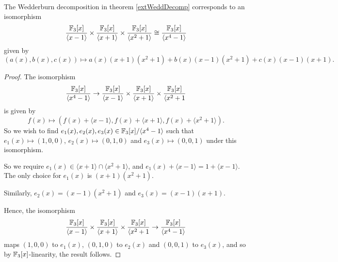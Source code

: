 \documentclass{unswmaths}
\begin{document}
\begin{lemma}
\label{intWeddDecomp}
    The Wedderburn decomposition in theorem \ref{extWeddDecomp} corresponds to
    an isomorphism
    \begin{equation*}
        \frac{{\mathbb{F}_3}[x]}{\langle x-1\rangle}\times\frac{{\mathbb{F}_3}[x]}{\langle x+1\rangle}\times\frac{{\mathbb{F}_3}[x]}{\langle x^2+1\rangle}\cong \frac{{\mathbb{F}_3}[x]}{\langle x^4-1\rangle}
    \end{equation*}
    given by
    \begin{equation*}
        (a(x),b(x),c(x))\mapsto a(x)(x+1)(x^2+1)+b(x)(x-1)(x^2+1)+c(x)(x-1)(x+1).
    \end{equation*}
\end{lemma}
\begin{proof}
    The isomorphism
    \begin{equation*}
        \frac{{\mathbb{F}_3}[x]}{\langle x^4-1\rangle} \rightarrow \frac{{\mathbb{F}_3}[x]}{\langle x-1\rangle}\times\frac{{\mathbb{F}_3}[x]}{\langle x+1\rangle}\times\frac{{\mathbb{F}_3}[x]}{\langle x^2+1}
    \end{equation*}
    is given by
    \begin{equation*}
        f(x) \mapsto (f(x)+\langle x-1\rangle,f(x)+\langle x+1\rangle,f(x)+\langle x^2+1\rangle).
    \end{equation*}
    So we wish to find $e_1(x),e_2(x),e_3(x) \in {\mathbb{F}_3}[x]/\langle x^4-1\rangle$ such that $e_1(x)\mapsto (1,0,0)$,
    $e_2(x)\mapsto (0,1,0)$ and $e_3(x)\mapsto (0,0,1)$ under this isomorphism.
    
    So we require $e_1(x) \in \langle x+1\rangle\cap\langle x^2+1\rangle$, and 
    $e_1(x) + \langle x-1\rangle = 1+\langle x-1\rangle$. The only choice for $e_1(x)$
    is $(x+1)(x^2+1)$. 
    
    Similarly, $e_2(x) = (x-1)(x^2+1)$ and $e_3(x) = (x-1)(x+1)$. 
    
    Hence, the isomorphism
    \begin{equation*}
        \frac{{\mathbb{F}_3}[x]}{\langle x-1\rangle}\times\frac{{\mathbb{F}_3}[x]}{\langle x+1\rangle}\times\frac{{\mathbb{F}_3}[x]}{\langle x^2+1}\rightarrow \frac{{\mathbb{F}_3}[x]}{\langle x^4-1\rangle}
    \end{equation*}
    maps $(1,0,0)$ to $e_1(x)$, $(0,1,0)$ to $e_2(x)$ and $(0,0,1)$ to $e_3(x)$, and 
    so by ${\mathbb{F}_3}[x]$-linearity, the result follows.
\end{proof}
\end{document}
